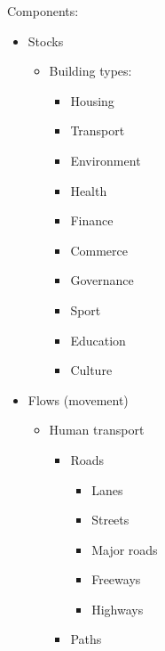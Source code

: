 \documentclass[]{article}
\begin{document}
Components:

\begin{itemize}
\itemsep1pt\parskip0pt
\item
  Stocks

  \begin{itemize}
  \itemsep1pt\parskip0pt
  \item
    Building types:

    \begin{itemize}
    \itemsep1pt\parskip0pt
    \item
      Housing
    \item
      Transport
    \item
      Environment
    \item
      Health
    \item
      Finance
    \item
      Commerce
    \item
      Governance
    \item
      Sport
    \item
      Education
    \item
      Culture
    \end{itemize}
  \end{itemize}
\item
  Flows (movement)

  \begin{itemize}
  \itemsep1pt\parskip0pt
  \item
    Human transport

    \begin{itemize}
    \itemsep1pt\parskip0pt
    \item
      Roads

      \begin{itemize}
      \itemsep1pt\parskip0pt
      \item
        Lanes
      \item
        Streets
      \item
        Major roads
      \item
        Freeways
      \item
        Highways
      \end{itemize}
    \item
      Paths


\end{itemize}
\end{itemize}
\end{itemize}
\end{document}
